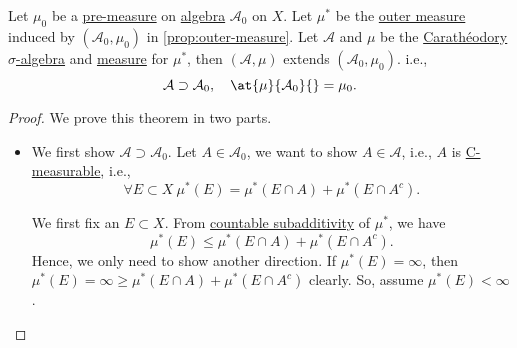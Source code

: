 \begin{theorem}\label{thm:Hahn-Kolmogorov-Thm}
	Let \(\mu_0\) be a \hyperref[def:pre-measure]{pre-measure} on \hyperref[def:algebra]{algebra} \(\mathcal{A} _0\) on \(X\).
	Let \(\mu^{*} \) be the \hyperref[def:outer-measure]{outer measure} induced by \((\mathcal{A} _0, \mu_0)\) in \autoref{prop:outer-measure}.
	Let \(\mathcal{A}\) and \(\mu\) be the \hyperref[thm:Caratheodory-extension-Thm]{Carathéodory \(\sigma\)-algebra} and \hyperref[def:measure]{measure} for \(\mu^{*} \), then
	\((\mathcal{A} , \mu)\) extends \((\mathcal{A} _0, \mu_0)\). i.e.,
	\[
		\mathcal{A} \supset \mathcal{A} _0,\quad \at{\mu}{\mathcal{A}_0 }{} = \mu_0.
	\]
\end{theorem}
\begin{proof}\let\qed\relax
	We prove this theorem in two parts.
	\begin{itemize}
		\item We first show \(\mathcal{A} \supset \mathcal{A} _0\). Let \(A\in \mathcal{A} _0\), we want to show \(A\in \mathcal{A} \), i.e.,
		      \(A\) is \hyperref[def:C-measurable]{C-measurable}, i.e.,
		      \[
			      \forall E\subset X\ \mu^{*} (E) = \mu^{*} (E\cap A) + \mu^{*} (E\cap A^{c}).
		      \]

		      \par We first fix an \(E\subset X\). From \hyperref[def:outer-measure-countable-subadditivity]{countable subadditivity} of \(\mu^{*} \), we have
		      \[
			      \mu^{*} (E) \leq \mu^{*} (E\cap A) + \mu^{*} (E\cap A^{c} ).
		      \]
		      Hence, we only need to show another direction. If \(\mu^{*} (E) = \infty \), then \(\mu^{*} (E) = \infty \geq \mu^{*} (E\cap A) + \mu^{*} (E\cap A^{c} )\) clearly.
		      So, assume \(\mu^{*} (E)<\infty \).


\end{itemize}
\end{proof}
